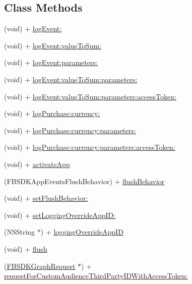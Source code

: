 \subsection*{Class Methods}
\begin{DoxyCompactItemize}
\item 
(void) + \hyperlink{interface_f_b_s_d_k_app_events_ab605cd80f86427aff7c1f8aabc7c66d5}{log\-Event\-:}
\item 
(void) + \hyperlink{interface_f_b_s_d_k_app_events_a58667a5b1a2d4afc624234221c95462b}{log\-Event\-:value\-To\-Sum\-:}
\item 
(void) + \hyperlink{interface_f_b_s_d_k_app_events_a92bd8932c1fc897b728fd4c4b07de08b}{log\-Event\-:parameters\-:}
\item 
(void) + \hyperlink{interface_f_b_s_d_k_app_events_aeefb69a9e678b9ffc9796a54eea8f1bd}{log\-Event\-:value\-To\-Sum\-:parameters\-:}
\item 
(void) + \hyperlink{interface_f_b_s_d_k_app_events_abbb2eb0ff301d10b128c1fedf035b8aa}{log\-Event\-:value\-To\-Sum\-:parameters\-:access\-Token\-:}
\item 
(void) + \hyperlink{interface_f_b_s_d_k_app_events_a57cc5c84810c0242b579d461cc5378dc}{log\-Purchase\-:currency\-:}
\item 
(void) + \hyperlink{interface_f_b_s_d_k_app_events_a4412a8f55bd2c0e9d0e7bcc4289002b5}{log\-Purchase\-:currency\-:parameters\-:}
\item 
(void) + \hyperlink{interface_f_b_s_d_k_app_events_a00c308db422bdf184e6abbcf6a809ce5}{log\-Purchase\-:currency\-:parameters\-:access\-Token\-:}
\item 
(void) + \hyperlink{interface_f_b_s_d_k_app_events_a4846c87fc0de72102972b2a78fbdeb09}{activate\-App}
\item 
(F\-B\-S\-D\-K\-App\-Events\-Flush\-Behavior) + \hyperlink{interface_f_b_s_d_k_app_events_a938b71bde76d5c02599778243d1e92e7}{flush\-Behavior}
\item 
(void) + \hyperlink{interface_f_b_s_d_k_app_events_ab5a903bcfe1f5bfa633cc9b202138fdc}{set\-Flush\-Behavior\-:}
\item 
(void) + \hyperlink{interface_f_b_s_d_k_app_events_a4ed11c9908b55d7d8dc8b790fb5dda67}{set\-Logging\-Override\-App\-I\-D\-:}
\item 
(N\-S\-String $\ast$) + \hyperlink{interface_f_b_s_d_k_app_events_a49a091e8ee936bb4bfac39fb4fe17c77}{logging\-Override\-App\-I\-D}
\item 
(void) + \hyperlink{interface_f_b_s_d_k_app_events_a29c403bbe9d6a720de1a42f739bba249}{flush}
\item 
(\hyperlink{interface_f_b_s_d_k_graph_request}{F\-B\-S\-D\-K\-Graph\-Request} $\ast$) + \hyperlink{interface_f_b_s_d_k_app_events_a47cb8cd6a8f098aad2c8aaf648f4ce0e}{request\-For\-Custom\-Audience\-Third\-Party\-I\-D\-With\-Access\-Token\-:}
\end{DoxyCompactItemize}


